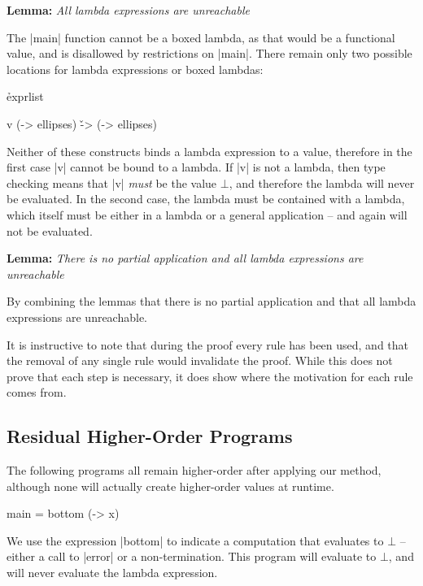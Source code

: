 \documentclass[preprint]{sigplanconf}
\newenvironment{lemma}[1]
    {\smallskip
     \noindent\textbf{Lemma:} \textit{#1}}
    {\noexample}
\begin{document}
\begin{lemma}{All lambda expressions are unreachable}

The |main| function cannot be a boxed lambda, as that would be a functional value, and is disallowed by restrictions on |main|. There remain only two possible locations for lambda expressions or boxed lambdas:

\h{exprlist}\begin{code}
v (\w -> ellipses)
\v -> (\w -> ellipses)
\end{code}

Neither of these constructs binds a lambda expression to a value, therefore in the first case |v| cannot be bound to a lambda. If |v| is not a lambda, then type checking means that |v| \textit{must} be the value $\bot{}$, and therefore the lambda will never be evaluated. In the second case, the lambda must be contained with a lambda, which itself must be either in a lambda or a general application -- and again will not be evaluated.
\end{lemma}

\begin{lemma}{There is no partial application and all lambda expressions are unreachable}

By combining the lemmas that there is no partial application and that all lambda expressions are unreachable.
\end{lemma}

It is instructive to note that during the proof every rule has been used, and that the removal of any single rule would invalidate the proof. While this does not prove that each step is necessary, it does show where the motivation for each rule comes from.

\subsection{Residual Higher-Order Programs}
\label{sec:example_residual}

The following programs all remain higher-order after applying our method, although none will actually create higher-order values at runtime.

\begin{example}
\begin{code}
main = bottom (\x -> x)
\end{code}

We use the expression |bottom| to indicate a computation that evaluates to $\bot{}$ -- either a call to |error| or a non-termination. This program will evaluate to $\bot{}$, and will never evaluate the lambda expression.
\end{example}
\end{document}
